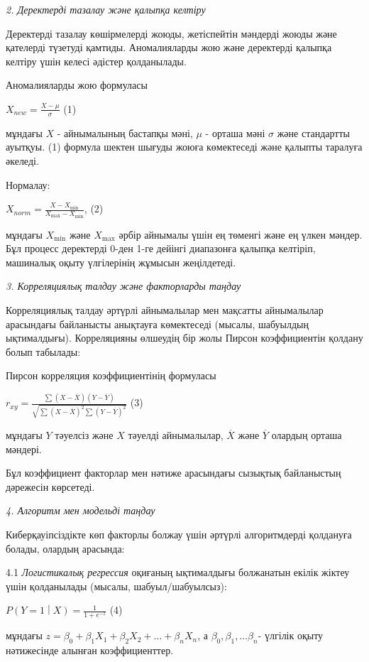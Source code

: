 \emph{2. Деректерді тазалау және қалыпқа келтіру}

Деректерді тазалау көшірмелерді жоюды, жетіспейтін мәндерді жоюды және
қателерді түзетуді қамтиды. Аномалияларды жою және деректерді қалыпқа
келтіру үшін келесі әдістер қолданылады.

Аномалияларды жою формуласы

\(X_{new} = \frac{X - \mu}{\sigma}\) (1)

мұндағы \(X\) - айнымалының бастапқы мәні, \(\mu\) - орташа мәні
\(\sigma\) және стандартты ауытқуы. (1) формула шектен шығуды жоюға
көмектеседі және қалыпты таралуға әкеледі.

Нормалау:

\(X_{norm} = \frac{X - X_{\min}}{X_{\max} - X_{\min}}\), (2)

мұндағы \(X_{\min}\) және \(X_{\max}\) әрбір айнымалы үшін ең төменгі
және ең үлкен мәндер. Бұл процесс деректерді 0-ден 1-ге дейінгі
диапазонға қалыпқа келтіріп, машиналық оқыту үлгілерінің жұмысын
жеңілдетеді.

\emph{3. Корреляциялық талдау және факторларды таңдау}

Корреляциялық талдау әртүрлі айнымалылар мен мақсатты айнымалылар
арасындағы байланысты анықтауға көмектеседі (мысалы, шабуылдың
ықтималдығы). Корреляцияны өлшеудің бір жолы Пирсон коэффициентін
қолдану болып табылады:

Пирсон корреляция коэффициентінің формуласы

\(r_{xy} = \frac{\sum_{}^{}{(X - \overline{X})(Y - \overline{Y})}}{\sqrt{\sum_{}^{}{{(X - \overline{X})}^{2}\sum_{}^{}{(Y - \overline{Y})}^{2}}}}\)
(3)

мұндағы \(Y\) тәуелсіз және \(X\) тәуелді айнымалылар, \(\overline{X}\)
және \(\overline{Y}\) олардың орташа мәндері.

Бұл коэффициент факторлар мен нәтиже арасындағы сызықтық байланыстың
дәрежесін көрсетеді.

\emph{4. Алгоритм мен модельді таңдау}

Киберқауіпсіздікте көп факторлы болжау үшін әртүрлі алгоритмдерді
қолдануға болады, олардың арасында:

4.1 \emph{Логистикалық регрессия} оқиғаның ықтималдығы болжанатын екілік
жіктеу үшін қолданылады (мысалы, шабуыл/шабуылсыз):

\(P\left( Y = 1 \middle| X \right) = \frac{1}{1 + e^{- z}}\) (4)

мұндағы
\(z = \beta_{0} + \beta_{1}X_{1} + \beta_{2}X_{2} + \ldots + \beta_{n}X_{n}\),
а \(\beta_{0},\beta_{1},\ldots\beta_{n}\)- үлгілік оқыту нәтижесінде
алынған коэффициенттер.

